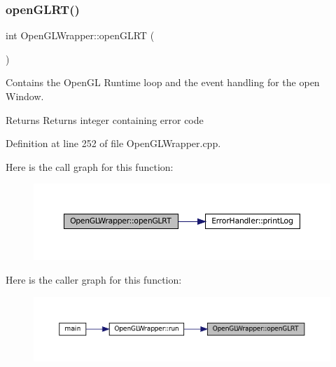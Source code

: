 \subsubsection{\texorpdfstring{openGLRT()}{openGLRT()}}
{\footnotesize\ttfamily int Open\+G\+L\+Wrapper\+::open\+G\+L\+RT (\begin{DoxyParamCaption}{ }\end{DoxyParamCaption})\hspace{0.3cm}{\ttfamily [private]}}



Contains the Open\+GL Runtime loop and the event handling for the open Window. 

\begin{DoxyReturn}{Returns}
Returns integer containing error code 
\end{DoxyReturn}


Definition at line 252 of file Open\+G\+L\+Wrapper.\+cpp.

Here is the call graph for this function\+:\nopagebreak
\begin{figure}[H]
\begin{center}
\leavevmode
\includegraphics[width=350pt]{classOpenGLWrapper_adfbe0218cff4daa4eb39cc6b53f7717f_cgraph}
\end{center}
\end{figure}
Here is the caller graph for this function\+:\nopagebreak
\begin{figure}[H]
\begin{center}
\leavevmode
\includegraphics[width=350pt]{classOpenGLWrapper_adfbe0218cff4daa4eb39cc6b53f7717f_icgraph}
\end{center}
\end{figure}
\mbox{\label{classOpenGLWrapper_aac166dc029379011ed0a29c8f6d74776}} 
